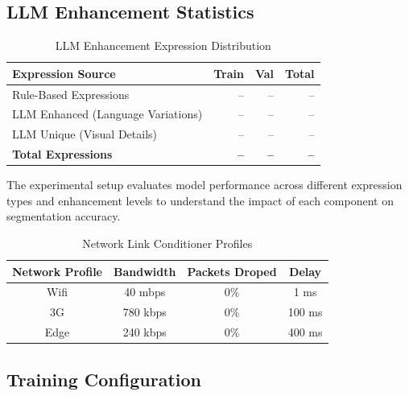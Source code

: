 \subsection{LLM Enhancement Statistics}

\begin{table}[H]
\centering
\caption{LLM Enhancement Expression Distribution}
\label{tab:llm_enhancement_stats}
\begin{tabular}{@{}lrrr@{}}
\toprule
\textbf{Expression Source} & \textbf{Train} & \textbf{Val} & \textbf{Total} \\
\midrule
Rule-Based Expressions & -- & -- & -- \\
LLM Enhanced (Language Variations) & -- & -- & -- \\
LLM Unique (Visual Details) & -- & -- & -- \\
\midrule
\textbf{Total Expressions} & \textbf{--} & \textbf{--} & \textbf{--} \\
\bottomrule
\end{tabular}
\end{table}

The experimental setup evaluates model performance across different expression types and enhancement levels to understand the impact of each component on segmentation accuracy.

\begin{table}[htb]
\centering
\normalsize
    \caption{Network Link Conditioner Profiles}
    \label{tab:network_profiles}
{\footnotesize
    \begin{tabular}{ | c | c | c | c | }
    \hline 
    \textbf{Network Profile}	& \textbf{Bandwidth} & \textbf{Packets Droped} & \textbf{Delay}\\ \hline \hline
    Wifi  & 40 mbps  &  0\%  &   1 ms \\ \hline
    3G  & 780 kbps  &  0\%  &   100 ms \\ \hline 
    Edge  & 240 kbps  &  0\%  &   400 ms \\ \hline
    \end{tabular}
    }
\end{table}

\subsection{Training Configuration}


